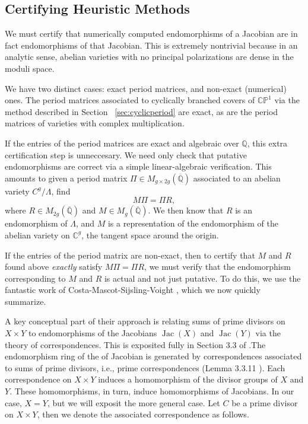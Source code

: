 \documentclass[12pt,reqno]{amsart}
\DeclareMathOperator{\Jac}{Jac}
\newcommand{\C}{\mathbb{C}}
\newcommand{\Q}{\mathbb{Q}}
\renewcommand{\P}{\mathbb{P}}
\theoremstyle{definition}
\theoremstyle{remark}
\begin{document}
\subsection{Certifying Heuristic Methods}
\label{sec:cert}

We must certify that numerically computed endomorphisms of a Jacobian are in fact endomorphisms of that Jacobian. This is extremely nontrivial because in an analytic sense, abelian varieties with no principal polarizations are dense in the moduli space. 

We have two distinct cases: exact period matrices, and non-exact (numerical) ones. The period matrices associated to cyclically branched covers of $\C\P^1$ via the method described in Section ~\ref{sec:cyclicperiod} are exact, as are the period matrices of varieties with complex multiplication. 

If the entries of the period matrices are exact and algebraic over $\Q$, this extra certification step is unneccesary. We need only check that putative endomorphisms are correct via a simple linear-algebraic verification. This amounts to given a period matrix $\Pi \in M_{g \times 2g}(\overline{\Q})$ associated to an abelian variety $C^g/\Lambda$, find
$$M \Pi = \Pi R,$$
where $R \in  M_{2g}(\overline{\Q})$ and $M \in M_{g}(\overline{\Q})$. We then know that $R$ is an endomorphism of $\Lambda$, and $M$ is a representation of the endomorphism of the abelian variety on $\C^g$, the tangent space around the origin.

If the entries of the period matrix are non-exact, then to certify that $M$ and $R$ found above \textit{exactly} satisfy $M \Pi = \Pi R$, we must verify that the endomorphism corresponding to $M$ and $R$ is actual and not just putative. To do this, we use the fantastic work of Costa-Mascot-Sijsling-Voight \cite{rigor}, which we now quickly summarize. 

A key conceptual part of their approach is relating sums of prime divisors on $X \times Y$ to endomorphisms of the Jacobians $\Jac(X)$ and $\Jac(Y)$ via the theory of correspondences. This is exposited fully in Section 3.3 of \cite{smith}.The endomorphism ring of the of Jacobian is generated by correspondences associated to sums of prime divisors, i.e., prime correspondences (Lemma 3.3.11 \cite{smith}). Each correspondence on $X \times Y$ induces a homomorphism of the divisor groups of $X$ and $Y$. These homomorphisms, in turn, induce homomorphisms of Jacobians. In our case, $X=Y$, but we will exposit the more general case. Let $C$ be a prime divisor on $X \times Y$, then we denote the associated correspondence as follows.
\end{document}
